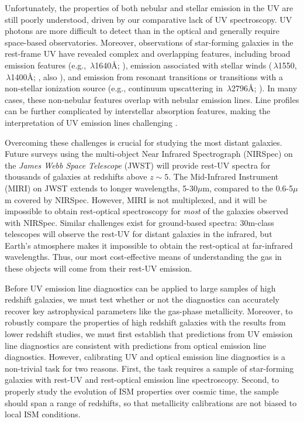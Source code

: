 \documentclass[preprint2]{aastex62}
\newcommand{\heii}{\ion{He}{2}}
\newcommand{\civ}{\ion{C}{4}}
\newcommand{\ang}{\ensuremath{\mbox{\AA}}\xspace}
\begin{document}
Unfortunately, the properties of both nebular and stellar emission in the UV are still poorly understood, driven by our comparative lack of UV spectroscopy. UV photons are more difficult to detect than in the optical and generally require space-based observatories. Moreover, observations of star-forming galaxies in the rest-frame UV have revealed complex and overlapping features, including broad emission features (e.g., \heii$\,\lambda$1640\ang; \citealt{Leitherer+2018}), emission associated with stellar winds (\civ$\,\lambda$1550, $\,\lambda$1400\ang; \citealt{Pettini+2000}, also \citealt{Chisholm+2019}), and emission from resonant transitions or transitions with a non-stellar ionization source (e.g., continuum upscattering in $\,\lambda$2796\ang; \citealt{Rigby+2014}). In many cases, these non-nebular features overlap with nebular emission lines. Line profiles can be further complicated by interstellar absorption features, making the interpretation of UV emission lines challenging \citep{Vidal-Garcia+2017}.

Overcoming these challenges is crucial for studying the most distant galaxies. Future surveys using the multi-object Near Infrared Spectrograph (NIRSpec) on the {\it James Webb Space Telescope} (JWST) will provide rest-UV spectra for thousands of galaxies at redshifts above $z{\sim}5$. The Mid-Infrared Instrument (MIRI) on JWST extends to longer wavelengths, 5-30$\mu$m, compared to the 0.6-5$\mu$m covered by NIRSpec. However, MIRI is not multiplexed, and it will be impossible to obtain rest-optical spectroscopy for \emph{most} of the galaxies observed with NIRSpec. Similar challenges exist for ground-based spectra: 30m-class telescopes will observe the rest-UV for distant galaxies in the infrared, but Earth's atmosphere makes it impossible to obtain the rest-optical at far-infrared wavelengths. Thus, our most cost-effective means of understanding the gas in these objects will come from their rest-UV emission. 

Before UV emission line diagnostics can be applied to large samples of high redshift galaxies, we must test whether or not the diagnostics can accurately recover key astrophysical parameters like the gas-phase metallicity. Moreover, to robustly compare the properties of high redshift galaxies with the results from lower redshift studies, we must first establish that predictions from UV emission line diagnostics are consistent with predictions from optical emission line diagnostics. However, calibrating UV and optical emission line diagnostics is a non-trivial task for two reasons. First, the task requires a sample of star-forming galaxies with rest-UV and rest-optical emission line spectroscopy. Second, to properly study the evolution of ISM properties over cosmic time, the sample should span a range of redshifts, so that metallicity calibrations are not biased to local ISM conditions.
\end{document}
